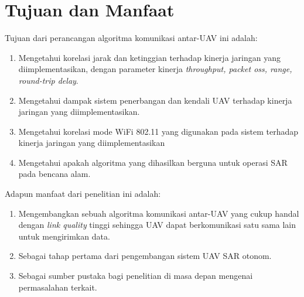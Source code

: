 \section{Tujuan dan Manfaat}
Tujuan dari perancangan algoritma komunikasi antar-UAV ini adalah:
\begin{enumerate}
	\item Mengetahui korelasi jarak dan ketinggian terhadap kinerja jaringan yang diimplementasikan, dengan parameter kinerja \textit{throughput, packet oss, range, round-trip delay}.
	\item Mengetahui dampak sistem penerbangan dan kendali UAV terhadap kinerja jaringan yang diimplementasikan.
	\item Mengetahui korelasi mode WiFi 802.11 yang digunakan pada sistem terhadap kinerja jaringan yang diimplementasikan
	\item Mengetahui apakah algoritma yang dihasilkan berguna untuk operasi SAR pada bencana alam.
\end{enumerate}
Adapun manfaat dari penelitian ini adalah:
\begin{enumerate}
	\item Mengembangkan sebuah algoritma komunikasi antar-UAV yang cukup handal dengan \textit{link quality} tinggi sehingga UAV dapat berkomunikasi satu sama lain untuk mengirimkan data.
	\item Sebagai tahap pertama dari pengembangan sistem UAV SAR otonom.
	\item Sebagai sumber pustaka bagi penelitian di masa depan mengenai permasalahan terkait.
\end{enumerate}

